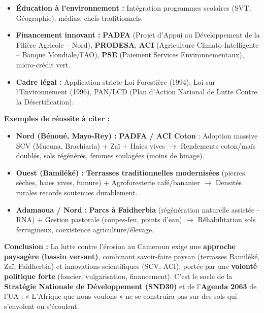 \documentclass[11pt]{article}
\begin{document}
\begin{corrige}
\begin{methode}
\begin{enumerate}
\begin{itemize}
        \item \textbf{Éducation à l'environnement :} Intégration programmes scolaires (SVT, Géographie), médias, chefs traditionnels.
        \item \textbf{Financement innovant :} \textbf{PADFA} (Projet d'Appui au Développement de la Filière Agricole -- Nord), \textbf{PRODESA}, \textbf{ACI} (Agriculture Climato-Intelligente -- Banque Mondiale/FAO), \textbf{PSE} (Paiement Services Environnementaux), micro-crédit vert.
        \item \textbf{Cadre légal :} Application stricte Loi Forestière (1994), Loi sur l'Environnement (1996), PAN/LCD (Plan d'Action National de Lutte Contre la Désertification).
    \end{itemize}
\end{enumerate}
\end{methode}

\medskip
\textbf{Exemples de réussite à citer :}
\begin{itemize}
    \item \textbf{Nord (Bénoué, Mayo-Rey) :} \textbf{PADFA / ACI Coton} : Adoption massive SCV (Mucuna, Brachiaria) + Zaï + Haies vives $\rightarrow$ Rendements coton/maïs doublés, sols régénérés, femmes soulagées (moins de binage).
    \item \textbf{Ouest (Bamiléké) :} \textbf{Terrasses traditionnelles modernisées} (pierres sèches, haies vives, fumure) + Agroforesterie café/bananier $\rightarrow$ Densités rurales records soutenues durablement.
    \item \textbf{Adamaoua / Nord :} \textbf{Parcs à Faidherbia} (régénération naturelle assistée - RNA) + Gestion pastorale (coupes-feu, points d'eau) $\rightarrow$ Réhabilitation sols ferrugineux, coexistence agriculture/élevage.
\end{itemize}

\medskip
\textbf{Conclusion :} La lutte contre l'érosion au Cameroun exige une \textbf{approche paysagère (bassin versant)}, combinant savoir-faire paysan (terrasses Bamiléké, Zaï, Faidherbia) et innovations scientifiques (SCV, ACI), portée par une \textbf{volonté politique forte} (foncier, vulgarisation, financement). C'est le socle de la \textbf{Stratégie Nationale de Développement (SND30)} et de l'\textbf{Agenda 2063} de l'UA : « L'Afrique que nous voulons » ne se construira pas sur des sols qui s'envolent ou s'écoulent.
\end{corrige}
\end{document}
